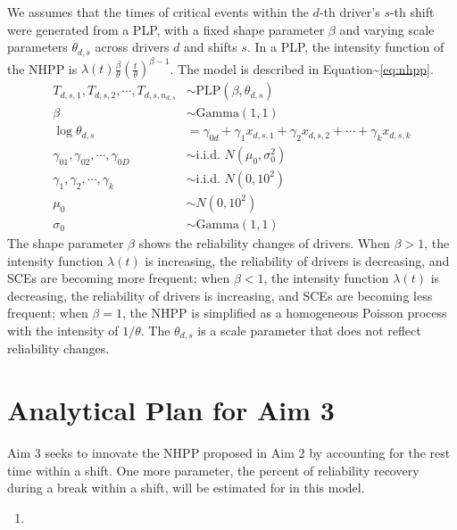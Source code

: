 \documentclass[12pt]{book}
\numberwithin{equation}{chapter}
\begin{document}
We assumes that the times of critical events within the \(d\)-th driver's \(s\)-th shift were generated from a PLP, with a fixed shape parameter \(\beta\) and varying scale parameters \(\theta_{d, s}\) across drivers \(d\) and shifts \(s\). In a PLP, the intensity function of the NHPP is \(\lambda(t) \frac{\beta}{\theta}(\frac{t}{\theta})^{\beta-1}\). The model is described in Equation\textasciitilde{}\ref{eq:nhpp}.
\begin{equation}\label{eq:nhpp}
\begin{aligned}
  T_{d, s, 1}, T_{d, s, 2}, \cdots , T_{d, s, n_{d, s}} & \sim \text{PLP}(\beta, \theta_{d, s})\\
  \beta & \sim \text{Gamma}(1, 1)\\
  \log\theta_{d, s} &= \gamma_{0d} + \gamma_{1}x_{d, s, 1} + \gamma_{2}x_{d, s, 2} + \cdots + \gamma_{k}x_{d, s, k}\\
  \gamma_{01}, \gamma_{02}, \cdots, \gamma_{0D} & \sim \text{i.i.d. }N(\mu_0, \sigma_0^2)\\
  \gamma_1, \gamma_2, \cdots, \gamma_k & \sim \text{i.i.d. }N(0, 10^2)\\
  \mu_0 &\sim N(0, 10^2) \\
  \sigma_0 &\sim \text{Gamma}(1, 1)
\end{aligned}
\end{equation}
The shape parameter \(\beta\) shows the reliability changes of drivers. When \(\beta > 1\), the intensity function \(\lambda(t)\) is increasing, the reliability of drivers is decreasing, and SCEs are becoming more frequent; when \(\beta < 1\), the intensity function \(\lambda(t)\) is decreasing, the reliability of drivers is increasing, and SCEs are becoming less frequent; when \(\beta = 1\), the NHPP is simplified as a homogeneous Poisson process with the intensity of \(1/\theta\). The \(\theta_{d, s}\) is a scale parameter that does not reflect reliability changes.

\hypertarget{analytical-plan-for-aim-3}{%
\section{Analytical Plan for Aim 3}\label{analytical-plan-for-aim-3}}

Aim 3 seeks to innovate the NHPP proposed in Aim 2 by accounting for the rest time within a shift. One more parameter, the percent of reliability recovery during a break within a shift, will be estimated for in this model.

\begin{enumerate}
\def\labelenumi{\arabic{enumi}.}
\item
\end{enumerate}
\end{document}
